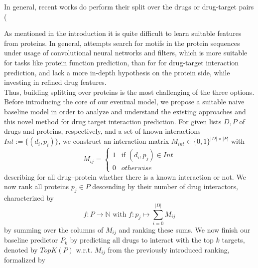 \documentclass{bioinfo}
\renewcommand{\cite}{\citep}
\begin{document}
In general, recent works do perform their split over the drugs or drug-target pairs (\cite{Survey2018}%


As mentioned in the introduction it is quite difficult to learn suitable features from proteins. In general, attempts search for motifs in the protein sequences under usage of convolutional neural networks and filters, which is more suitable for tasks like protein function prediction, than for for drug-target interaction prediction, and lack a more in-depth hypothesis on the protein side, while investing in refined drug features. \\
Thus, building splitting over proteins is the most challenging of the three options. \\





Before introducing the core of our eventual model, we propose a suitable naive baseline model in order to analyze and understand the existing approaches and this novel method for drug target interaction prediction. For given lists $D, P$ of drugs and proteins, respectively, and a set of known interactions $Int := \{(d_i, p_i) \}$, we construct an interaction matrix $M_{int}\in\{0,1\}^{|D|\times|P|}$ with 
\begin{equation*}
	M_{ij} = \begin{cases}
		1 & \text{if } (d_i, p_j)\in Int\\
		0 & otherwise
	\end{cases}
\end{equation*}
describing for all drug--protein whether there is a known interaction or not. We now rank all proteins $p_j\in P$ descending by their number of drug interactors, characterized by 
\begin{equation*}
	f: P \rightarrow \mathbb{N} \text{ with } f:p_j \mapsto \sum_{i=0}^{|D|}M_{ij}
\end{equation*}
by summing over the columns of $M_{ij}$ and ranking these sums.
We now finish our baseline predictor $P_k$ by predicting all drugs to interact with the top $k$ targets, denoted by $TopK(P)$ w.r.t. $M_{ij}$ from the previously introduced ranking, formalized by 
\end{document}
